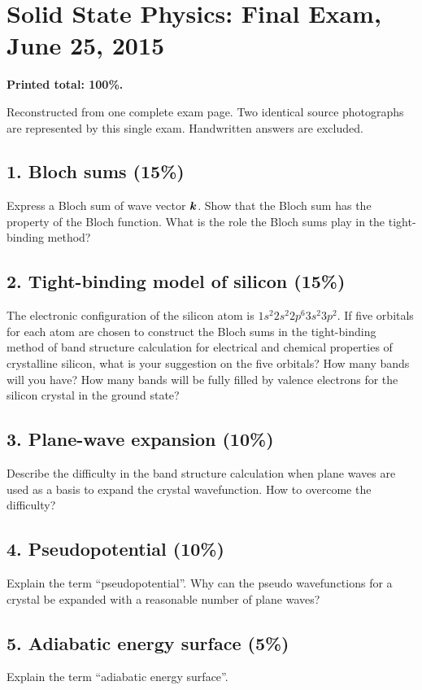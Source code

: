 \chapter{Solid State Physics: Final Exam, June 25, 2015}
\label{q:physics-2015-06-final}
\textbf{Printed total: 100\%.}
\begin{sourceNote}
Reconstructed from one complete exam page. Two identical source photographs are represented by this single exam. Handwritten answers are excluded.
\end{sourceNote}

\section*{1. Bloch sums (15\%)}
Express a Bloch sum of wave vector $\boldsymbol{k}$. Show that the Bloch sum has the property of the Bloch function. What is the role the Bloch sums play in the tight-binding method?

\section*{2. Tight-binding model of silicon (15\%)}
The electronic configuration of the silicon atom is
$1s^2 2s^2 2p^6 3s^2 3p^2$.
If five orbitals for each atom are chosen to construct the Bloch sums in the tight-binding method of band structure calculation for electrical and chemical properties of crystalline silicon, what is your suggestion on the five orbitals? How many bands will you have? How many bands will be fully filled by valence electrons for the silicon crystal in the ground state?

\section*{3. Plane-wave expansion (10\%)}
Describe the difficulty in the band structure calculation when plane waves are used as a basis to expand the crystal wavefunction. How to overcome the difficulty?

\section*{4. Pseudopotential (10\%)}
Explain the term ``pseudopotential''. Why can the pseudo wavefunctions for a crystal be expanded with a reasonable number of plane waves?

\section*{5. Adiabatic energy surface (5\%)}
Explain the term ``adiabatic energy surface''.

